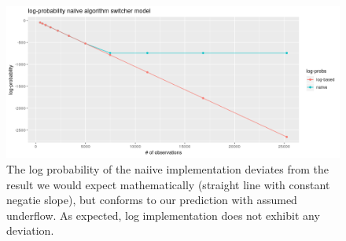 \begin{figure}
	\includegraphics[width=\linewidth]{../forward_algorithm/superiority_log_approach.png}
	\caption{The log probability of the naiive implementation deviates from the result we would expect mathematically (straight line with constant negatie slope), but conforms to our prediction with assumed underflow. As expected, log implementation does not exhibit any deviation.}
	\label{log_impl_no_more_underflow}
\end{figure}


















